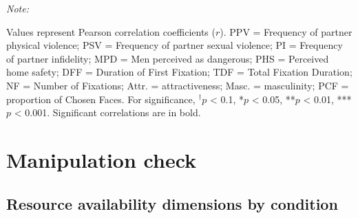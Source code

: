 \documentclass[
  bookmarksnumbered]{article}
\begin{document}
\begin{table}[H]
{\begin{threeparttable}
\begin{tablenotes}[para]
\item \textit{Note: } 
\item Values represent Pearson correlation coefficients ($r$). PPV = Frequency of partner physical violence; 
                            PSV = Frequency of partner sexual violence;
                            PI =  Frequency of partner infidelity; 
                            MPD = Men perceived as dangerous;
                            PHS = Perceived home safety;
                            DFF = Duration of First Fixation; 
                            TDF = Total Fixation Duration; 
                            NF = Number of Fixations; 
                            Attr. = attractiveness; 
                            Masc. = masculinity;
                            PCF = proportion of Chosen Faces. For significance, $^{\dagger}p$ < 0.1, *$p$ < 0.05, **$p$ < 0.01, ***$p$ < 0.001. Significant correlations are in bold.
\end{tablenotes}
\end{threeparttable}}
\end{table}

\section{Manipulation check}\label{manipulation-check}

\subsection{Resource availability dimensions by condition}\label{resource-availability-dimensions-by-condition}
\end{document}
